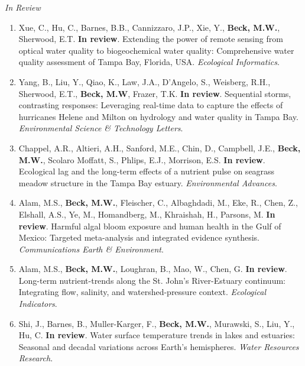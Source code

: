 \documentclass[letterpaper,12pt]{article}
\newcommand{\subsectitle}[1]{\vspace{\baselineskip} \centerline{\normalsize{\textit{#1}}}}
\begin{document}
\subsectitle{In Review}

\begin{enumerate}

\item Xue, C., Hu, C., Barnes, B.B., Cannizzaro, J.P., Xie, Y., \textbf{Beck, M.W.}, Sherwood, E.T. \textbf{In review}. Extending the power of remote sensing from optical water quality to biogeochemical water quality: Comprehensive water quality assessment of Tampa Bay, Florida, USA. \textit{Ecological Informatics}.

\item Yang, B., Liu, Y., Qiao, K., Law, J.A., D'Angelo, S., Weisberg, R.H., Sherwood, E.T., \textbf{Beck, M.W}, Frazer, T.K. \textbf{In review}. Sequential storms, contrasting responses: Leveraging real-time data to capture the effects of hurricanes Helene and Milton on hydrology and water quality in Tampa Bay. \textit{Environmental Science \& Technology Letters}.

\item Chappel, A.R., Altieri, A.H., Sanford, M.E., Chin, D., Campbell, J.E., \textbf{Beck, M.W.}, Scolaro Moffatt, S., Phlips, E.J., Morrison, E.S. \textbf{In review}. Ecological lag and the long-term effects of a nutrient pulse on seagrass meadow structure in the Tampa Bay estuary. \textit{Environmental Advances}.

\item Alam, M.S., \textbf{Beck, M.W.}, Fleischer, C., Albaghdadi, M., Eke, R., Chen, Z., Elshall, A.S., Ye, M., Homandberg, M., Khraishah, H., Parsons, M. \textbf{In review}. Harmful algal bloom exposure and human health in the Gulf of Mexico: Targeted meta-analysis and integrated evidence synthesis. \textit{Communications Earth \& Environment}.

\item Alam, M.S., \textbf{Beck, M.W.}, Loughran, B., Mao, W., Chen, G. \textbf{In review}. Long-term nutrient-trends along the St. John's River-Estuary continuum: Integrating flow, salinity, and watershed-pressure context. \textit{Ecological Indicators}.

\item Shi, J., Barnes, B., Muller-Karger, F., \textbf{Beck, M.W.}, Murawski, S., Liu, Y., Hu, C. \textbf{In review}. Water surface temperature trends in lakes and estuaries: Seasonal and decadal variations across Earth's hemispheres. \textit{Water Resources Research}.

\end{enumerate}
\end{document}
